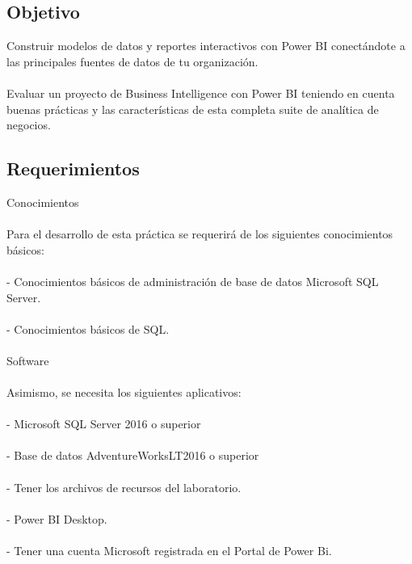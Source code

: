 \documentclass[12pt,letterpaper]{article}
\begin{document}
\subsection*{Objetivo} 
Construir modelos de datos y reportes interactivos con Power BI conectándote a las principales fuentes de datos de tu organización. 
\\\\Evaluar un proyecto de Business Intelligence con Power BI teniendo en cuenta buenas prácticas y las características de esta completa suite de analítica de negocios.

\subsection*{Requerimientos}
Conocimientos \\\\
Para el desarrollo de esta práctica se requerirá de los siguientes conocimientos básicos: 
\\\\
- Conocimientos básicos de administración de base de datos Microsoft SQL Server. 
\\\\
- Conocimientos básicos de SQL.
\\\\
Software \\\\
Asimismo, se necesita los siguientes aplicativos: 
\\\\
- Microsoft SQL Server 2016 o superior 
\\\\
- Base de datos AdventureWorksLT2016 o superior
\\\\
- Tener los archivos de recursos del laboratorio. 
\\\\
- Power BI Desktop. 
\\\\
- Tener una cuenta Microsoft registrada en el Portal de Power Bi. 
\\\\
\end{document}
